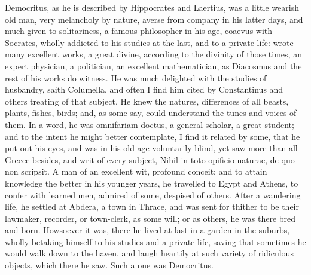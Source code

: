 {Democritus, as he is described by Hippocrates and Laertius, was
a little wearish old man, very melancholy by nature, averse from
company in his latter days, and much given to solitariness, a
famous philosopher in his age, coaevus with Socrates, wholly
addicted to his studies at the last, and to a private life: wrote many
excellent works, a great divine, according to the divinity of those
times, an expert physician, a politician, an excellent mathematician,
as Diacosmus and the rest of his works do witness. He was much
delighted with the studies of husbandry, saith Columella, and often
I find him cited by Constantinus and others treating of that
subject. He knew the natures, differences of all beasts, plants,
fishes, birds; and, as some say, could understand the tunes and
voices of them. In a word, he was \textlatin{omnifariam doctus}, a general scholar,
a great student; and to the intent he might better contemplate, I
find it related by some, that he put out his eyes, and was in his old
age voluntarily blind, yet saw more than all Greece besides, and 
writ of every subject, \textlatin{Nihil in toto opificio naturae, de quo non
scripsit.} A man of an excellent wit, profound conceit; and to
attain knowledge the better in his younger years, he travelled to Egypt
and  Athens, to confer with learned men, admired of some,
despised of others. After a wandering life, he settled at Abdera, a
town in Thrace, and was sent for thither to be their lawmaker,
recorder, or town-clerk, as some will; or as others, he was there bred
and born. Howsoever it was, there he lived at last in a garden in the
suburbs, wholly betaking himself to his studies and a private life,
saving that sometimes he would walk down to the haven, and
laugh heartily at such variety of ridiculous objects, which there he
saw. Such a one was Democritus.

}
